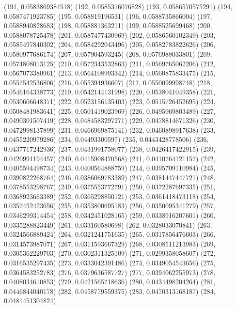 {					(191, 0.0583869384518)
					(192, 0.0585316076828)
					(193, 0.0586570575291)
					(194, 0.0587471923785)
					(195, 0.058819196531)
					(196, 0.0588735866004)
					(197, 0.0588940828683)
					(198, 0.058881363211)
					(199, 0.0588525699468)
					(200, 0.0588078725478)
					(201, 0.0587477430969)
					(202, 0.0586560102349)
					(203, 0.0585497840302)
					(204, 0.0584292043496)
					(205, 0.0582783822626)
					(206, 0.0580977686174)
					(207, 0.057904593245)
					(208, 0.0576988033801)
					(209, 0.0574808013125)
					(210, 0.0572343532863)
					(211, 0.0569765062206)
					(212, 0.0567073380961)
					(213, 0.0564108993342)
					(214, 0.0560875833475)
					(215, 0.0557542536806)
					(216, 0.055394936607)
					(217, 0.0550099998748)
					(218, 0.0546164338773)
					(219, 0.0542144131998)
					(220, 0.0538041049358)
					(221, 0.0530606648371)
					(222, 0.0523156135403)
					(223, 0.0515726452695)
					(224, 0.0508481983641)
					(225, 0.0501419023969)
					(226, 0.0495969803489)
					(227, 0.0490301507419)
					(228, 0.0484583297271)
					(229, 0.0478814671326)
					(230, 0.0472998137899)
					(231, 0.0466969875141)
					(232, 0.0460898917638)
					(233, 0.0455220979286)
					(234, 0.04493300597)
					(235, 0.0443428778506)
					(236, 0.0437717242936)
					(237, 0.0431991758077)
					(238, 0.0426417422915)
					(239, 0.0420991194457)
					(240, 0.0415908470568)
					(241, 0.0410764121157)
					(242, 0.0405594498734)
					(243, 0.0400564888759)
					(244, 0.0395709110984)
					(245, 0.0390822268764)
					(246, 0.0386069783389)
					(247, 0.0381447447721)
					(248, 0.0378553298767)
					(249, 0.0375553772791)
					(250, 0.0372287697335)
					(251, 0.0368923663389)
					(252, 0.0365298850121)
					(253, 0.0361418473118)
					(254, 0.0357452423656)
					(255, 0.0353800695183)
					(256, 0.0350095341279)
					(257, 0.0346299314454)
					(258, 0.0342451028165)
					(259, 0.0338916207601)
					(260, 0.0335288823449)
					(261, 0.033160580698)
					(262, 0.0328033070841)
					(263, 0.0324566889424)
					(264, 0.0321241751635)
					(265, 0.0317856476603)
					(266, 0.0314573987071)
					(267, 0.0311593667329)
					(268, 0.0308511213983)
					(269, 0.0305362229703)
					(270, 0.0302311325109)
					(271, 0.0299358058607)
					(272, 0.0316535297435)
					(273, 0.0333042391486)
					(274, 0.0349054543656)
					(275, 0.0364583252783)
					(276, 0.0379636587727)
					(277, 0.0394062255973)
					(278, 0.0408034610853)
					(279, 0.0421565718636)
					(280, 0.0434498204264)
					(281, 0.0446844040178)
					(282, 0.0458779559375)
					(283, 0.0470313168187)
					(284, 0.0481451304824)
}
